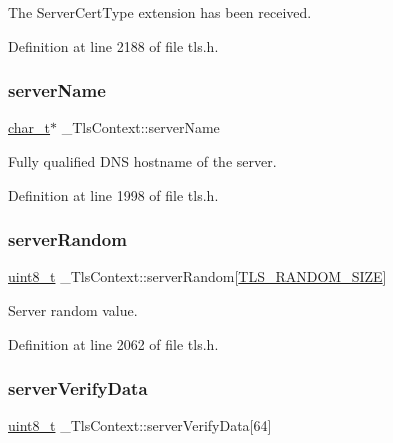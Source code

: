 The Server\+Cert\+Type extension has been received. 



Definition at line 2188 of file tls.\+h.

\mbox{\label{struct__TlsContext_a740513ffb7f2b2f0667ebcf6af1254eb}} 
\subsubsection{\texorpdfstring{server\+Name}{serverName}}
{\footnotesize\ttfamily \hyperlink{compiler__port_8h_a40bb5262bf908c328fbcfbe5d29d0201}{char\+\_\+t}$\ast$ \+\_\+\+Tls\+Context\+::server\+Name}



Fully qualified D\+NS hostname of the server. 



Definition at line 1998 of file tls.\+h.

\mbox{\label{struct__TlsContext_a0f151ab40e38abded1d4fb0baf9149b7}} 
\subsubsection{\texorpdfstring{server\+Random}{serverRandom}}
{\footnotesize\ttfamily \hyperlink{stdint_8h_aba7bc1797add20fe3efdf37ced1182c5}{uint8\+\_\+t} \+\_\+\+Tls\+Context\+::server\+Random\mbox{[}\hyperlink{tls_8h_aafeca350828039567f4495388ca1fa52}{T\+L\+S\+\_\+\+R\+A\+N\+D\+O\+M\+\_\+\+S\+I\+ZE}\mbox{]}}



Server random value. 



Definition at line 2062 of file tls.\+h.

\mbox{\label{struct__TlsContext_afa01855dd493cebbf4fa96e74bd5b343}} 
\subsubsection{\texorpdfstring{server\+Verify\+Data}{serverVerifyData}}
{\footnotesize\ttfamily \hyperlink{stdint_8h_aba7bc1797add20fe3efdf37ced1182c5}{uint8\+\_\+t} \+\_\+\+Tls\+Context\+::server\+Verify\+Data\mbox{[}64\mbox{]}}



